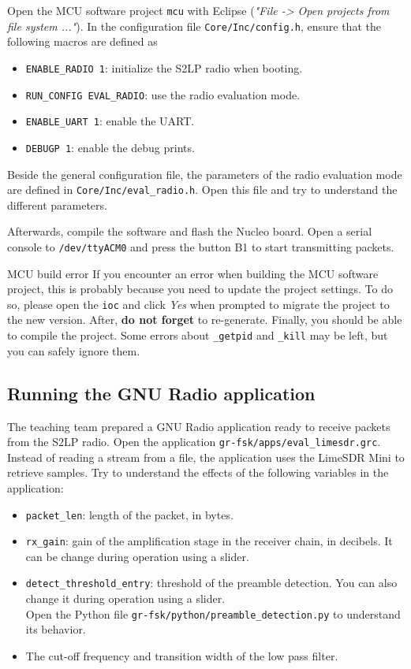 Open the MCU software project \texttt{mcu} with Eclipse (\textit{"File -> Open projects from file system ..."}).
In the configuration file \texttt{Core/Inc/config.h}, ensure that the following macros are defined as
\begin{itemize}
    \item \texttt{ENABLE\_RADIO 1}: initialize the S2LP radio when booting.
    \item \texttt{RUN\_CONFIG EVAL\_RADIO}: use the radio evaluation mode.
    \item \texttt{ENABLE\_UART 1}: enable the UART.
    \item \texttt{DEBUGP 1}: enable the debug prints.
\end{itemize}

Beside the general configuration file, the parameters of the radio evaluation mode are defined in \texttt{Core/Inc/eval\_radio.h}.
Open this file and try to understand the different parameters.

Afterwards, compile the software and flash the Nucleo board. Open a serial console to \texttt{/dev/ttyACM0} and press the button B1 to start transmitting packets.

\begin{bclogo}[couleur = gray!20, arrondi = 0.2, logo=\bcinfo]{MCU build error}
    If you encounter an error when building the MCU software project, this is probably because you need to update the project settings. To do so, please open the \texttt{ioc} and click \textit{Yes} when prompted to migrate the project to the new version. After, \textbf{do not forget} to re-generate. Finally, you should be able to compile the project. Some errors about \texttt{\_getpid} and \texttt{\_kill} may be left, but you can safely ignore them.
\end{bclogo}

\subsection{Running the GNU Radio application}

The teaching team prepared a GNU Radio application ready to receive packets from the S2LP radio.
Open the application \texttt{gr-fsk/apps/eval\_limesdr.grc}. Instead of reading a stream from a file, the application uses the LimeSDR Mini
to retrieve samples. Try to understand the effects of the following variables in the application:
\begin{itemize}
    \item \texttt{packet\_len}: length of the packet, in bytes.
    \item \texttt{rx\_gain}: gain of the amplification stage in the receiver chain, in decibels. It can be change during operation using a slider.
    \item \texttt{detect\_threshold\_entry}: threshold of the preamble detection. You can also change it during operation using a slider.\\
    Open the Python file \texttt{gr-fsk/python/preamble\_detection.py} to understand its behavior.
    \item The cut-off frequency and transition width of the low pass filter.
\end{itemize}

